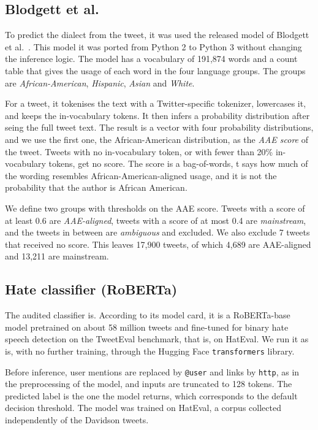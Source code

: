 \documentclass[runningheads,a4paper,oribibl]{llncs}
\begin{document}
\subsection{Blodgett et al.}\label{sec:dialect}
To predict the dialect from the tweet, it was used the released model of Blodgett et al.~\cite{blodgett2016}.
This model it was ported from Python 2 to Python 3 without changing the inference logic. 
The model has a vocabulary of 191,874 words and a count table that gives the usage of each
word in the four language groups. The groups are \emph{African-American}, \emph{Hispanic}, \emph{Asian}
and \emph{White}. 

For a tweet, it tokenises the text with a Twitter-specific tokenizer, lowercases it, and keeps
the in-vocabulary tokens. It then infers a probability distribution after seing the full tweet text.
The result is a vector with four probability distributions, and we use the first one, the African-American distribution,
as the \emph{AAE score} of the tweet. Tweets with no in-vocabulary token, or with fewer than 20\% in-vocabulary
tokens, get no score. The score is a bag-of-words, t says how much of the wording resembles African-American-aligned
usage, and it is not the probability that the author is African American.

We define two groups with thresholds on the AAE score. Tweets with a score of at least 0.6 are \emph{AAE-aligned},
tweets with a score of at most 0.4 are \emph{mainstream}, and the tweets in between are \emph{ambiguous}
and excluded. We also exclude 7 tweets that received no score. This leaves 17,900 tweets, of which
4,689 are AAE-aligned and 13,211 are mainstream. 

\subsection{Hate classifier (RoBERTa)}
The audited classifier is. According to its model card, it is a RoBERTa-base model
pretrained on about 58 million tweets and fine-tuned for binary hate speech detection on the TweetEval
benchmark, that is, on HatEval. We run it as is, with no further
training, through the Hugging Face \texttt{transformers} library.

Before inference, user mentions are replaced by \texttt{@user} and links by \texttt{http}, as in the
preprocessing of the model, and inputs are truncated to 128 tokens. The predicted label is the one the
model returns, which corresponds to the default decision threshold. The model was trained on HatEval,
a corpus collected independently of the Davidson tweets. 
\end{document}
